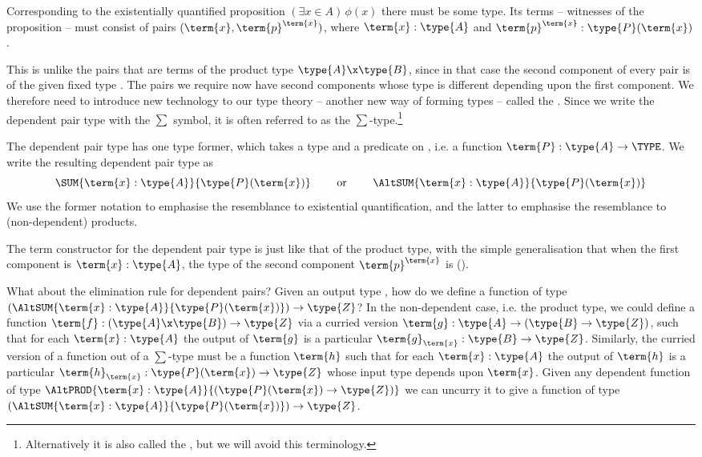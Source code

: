 Corresponding to the existentially quantified proposition 
$(\exists x \in A)\, \phi(x)$
there must be some type.  Its terms -- witnesses of the proposition -- must consist of pairs $(\term{x},\term{p}^{\term{x}})$, 
where
$\term{x}:\type{A}$ 
and 
$\term{p}^{\term{x}}:\type{P}(\term{x})$. 

This is unlike the pairs that are terms of the product type $\type{A}\x\type{B}$, since in that case the second component of every pair is of the given fixed type .  The pairs we require now have second components whose type is different depending upon the first component.  We therefore need to introduce new technology to our type theory -- another new way of forming types -- called the .  Since we write the dependent pair type with the $\sum$ symbol, it is often referred to as the $\sum$-type.\footnote{
Alternatively it is also called the , but we will avoid this terminology.
}

The dependent pair type 
has one type former, which takes a type  and a predicate on , i.e. a function $\term{P}:\type{A} \to \TYPE$.  We write the resulting dependent pair type as
\[
\SUM{\term{x}:\type{A}}{\type{P}(\term{x})}
\quad\quad\mbox{ or }\quad\quad
\AltSUM{\term{x}:\type{A}}{\type{P}(\term{x})}
\]
We use the former notation to emphasise the resemblance to existential quantification, and the latter to emphasise the resemblance to (non-dependent) products.

The term constructor for the 
dependent pair type 
is just like that of the product type, with the simple generalisation that when the first component is $\term{x}:\type{A}$, 
the type of the second component $\term{p}^{\term{x}}$ is ().


What about the elimination rule for dependent pairs?  Given an output type , how do we define a function 
of type 
$\left(\AltSUM{\term{x}:\type{A}}{\type{P}(\term{x})}\right) \to \type{Z}$?  In the non-dependent case, i.e. the product type, we could define a function $\term{f}:(\type{A} \x \type{B}) \to \type{Z}$ via a curried version
$\term{g}:\type{A} \to (\type{B} \to \type{Z})$, such that for each 
$\term{x}:\type{A}$ the output of
$\term{g}$ is a particular 
$\term{g}_{\term{x}}: \type{B} \to \type{Z}$.
Similarly, the curried version of a function out of a $\sum$-type
must be a function $\term{h}$ such that for each 
$\term{x}:\type{A}$ the output of
$\term{h}$ is a particular 
$\term{h}_{\term{x}}: \type{P}(\term{x}) \to \type{Z}$ whose input type depends upon $\term{x}$.  
%
Given any dependent function of type 
$\AltPROD{\term{x}:\type{A}}{(\type{P}(\term{x}) \to \type{Z})}$ 
we can uncurry it to give a function of type
$\left(\AltSUM{\term{x}:\type{A}}{\type{P}(\term{x})}\right) \to \type{Z}$.



